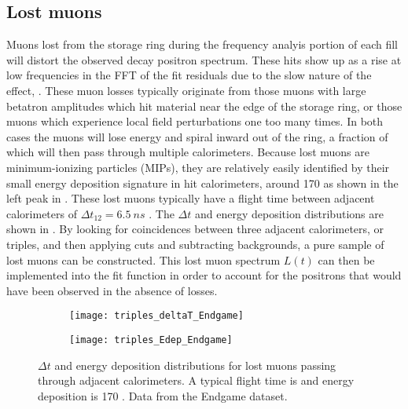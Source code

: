 \subsection{Lost muons}
\label{subsec:lostmuons}


Muons lost from the storage ring during the frequency analyis portion of each fill will distort the observed decay positron spectrum. These hits show up as a rise at low frequencies in the FFT of the fit residuals due to the slow nature of the effect, . These muon losses typically originate from those muons with large betatron amplitudes which hit material near the edge of the storage ring, or those muons which experience local field perturbations one too many times. In both cases the muons will lose energy and spiral inward out of the ring, a fraction of which will then pass through multiple calorimeters. Because lost muons are minimum-ionizing particles (MIPs), they are relatively easily identified by their small energy deposition signature in hit calorimeters, around 170 \MeV as shown in the left peak in . These lost muons typically have a flight time between adjacent calorimeters of $\Delta t_{12} = \SI{6.5}{ns}$ \cite{lostmuonspaper,lostmuonsDenverTalk}. The $\Delta t$ and energy deposition distributions are shown in . By looking for coincidences between three adjacent calorimeters, or triples, and then applying cuts and subtracting backgrounds, a pure sample of lost muons can be constructed. This lost muon spectrum $L(t)$ can then be implemented into the fit function in order to account for the positrons that would have been observed in the absence of losses.

\begin{figure}[]
\centering
    \begin{subfigure}[]{0.48\textwidth}
        \centering
        \texttt{[image: triples\_deltaT\_Endgame]}
        \caption{}
    \end{subfigure}%
    \begin{subfigure}[]{0.48\textwidth}
        \centering
        \texttt{[image: triples\_Edep\_Endgame]}
        \caption{}
    \end{subfigure}
\caption[Lost muon $\Delta t$ and energy deposition distributions]{$\Delta t$ and energy deposition distributions for lost muons passing through adjacent calorimeters. A typical flight time is  and energy deposition is 170 \MeV. Data from the Endgame dataset.}
\label{fig:lostmuondistributions}
\end{figure}


